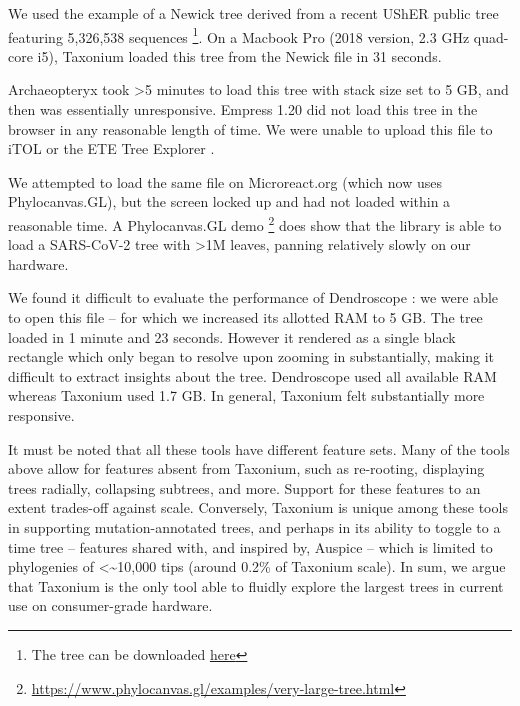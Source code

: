 We used the example of a Newick tree derived from a recent UShER public tree \citep{McBroome2021} featuring 5,326,538 sequences \footnote{The tree can be downloaded \href{https://hgwdev.gi.ucsc.edu/~angie/UShER\_SARS-CoV-2/2022/05/17/public-2022-05-17.all.nwk.gz}{here}}. On a Macbook Pro (2018 version, 2.3 GHz quad-core i5), Taxonium loaded this tree from the Newick file in 31 seconds. 

Archaeopteryx \citep{archaeopteryx} took >5 minutes to load this tree with stack size set to 5 GB, and then was essentially unresponsive. Empress 1.20 \citep{CantrellFedarko2021empress} did not load this tree in the browser in any reasonable length of time. We were unable to upload this file to iTOL \citep{itol} or the ETE Tree Explorer \citep{ete}.

We attempted to load the same file on Microreact.org \citep{argimon2016microreact} (which now uses Phylocanvas.GL), but the screen locked up and had not loaded within a reasonable time. A Phylocanvas.GL demo \footnote{\url{https://www.phylocanvas.gl/examples/very-large-tree.html}} does show that the library \citep{abudahab2021phylocanvas} is able to load a SARS-CoV-2 tree with >1M leaves, panning relatively slowly on our hardware.

We found it difficult to evaluate the performance of Dendroscope \citep{pmid18034891}: we were able to open this file -- for which we increased its allotted RAM to 5 GB. The tree loaded in 1 minute and 23 seconds. However it rendered as a single black rectangle which only began to resolve upon zooming in substantially, making it difficult to extract insights about the tree. Dendroscope used all available RAM whereas Taxonium used 1.7 GB. In general, Taxonium felt substantially more responsive.


It must be noted that all these tools have different feature sets. Many of the tools above allow for features absent from Taxonium, such as re-rooting, displaying trees radially, collapsing subtrees, and more. Support for these features to an extent trades-off against scale. Conversely, Taxonium is unique among these tools in supporting mutation-annotated trees, and perhaps in its ability to toggle to a time tree -- features shared with, and inspired by, Auspice \citep{nextstrain} -- which is limited to phylogenies of <\textasciitilde10,000 tips (around 0.2\% of  Taxonium scale). In sum, we argue that Taxonium is the only tool able to fluidly explore the largest trees in current use on consumer-grade hardware.




